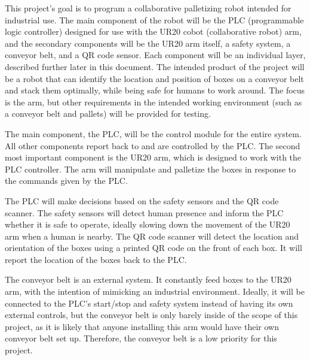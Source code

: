 This project's goal is to program a collaborative palletizing robot intended for industrial use. The main component of the robot will be the PLC (programmable logic controller) designed for use with the UR20 cobot (collaborative robot) arm, and the secondary components will be the UR20 arm itself, a safety system, a conveyor belt, and a QR code sensor. Each component will be an individual layer, described further later in this document. The intended product of the project will be a robot that can identify the location and position of boxes on a conveyor belt and stack them optimally, while being safe for humans to work around. The focus is the arm, but other requirements in the intended working environment (such as a conveyor belt and pallets) will be provided for testing.

The main component, the PLC, will be the control module for the entire system. All other components report back to and are controlled by the PLC. The second most important component is the UR20 arm, which is designed to work with the PLC controller. The arm will manipulate and palletize the boxes in response to the commands given by the PLC.

The PLC will make decisions based on the safety sensors and the QR code scanner. The safety sensors will detect human presence and inform the PLC whether it is safe to operate, ideally slowing down the movement of the UR20 arm when a human is nearby. The QR code scanner will detect the location and orientation of the boxes using a printed QR code on the front of each box. It will report the location of the boxes back to the PLC. 

The conveyor belt is an external system. It constantly feed boxes to the UR20 arm, with the intention of mimicking an industrial environment. Ideally, it will be connected to the PLC's start/stop and safety system instead of having its own external controls, but the conveyor belt is only barely inside of the scope of this project, as it is likely that anyone installing this arm would have their own conveyor belt set up. Therefore, the conveyor belt is a low priority for this project. 